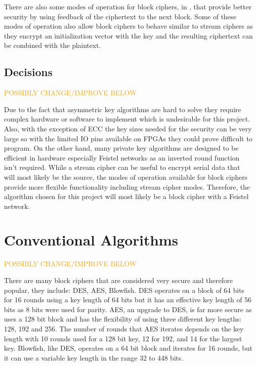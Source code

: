\documentclass[12pt,twoside,a4paper]{report}
\begin{document}
	There are also some modes of operation for block ciphers, in \cite{Dworkin2001}, that provide better security by using feedback of the ciphertext to the next block. Some of these modes of operation also allow block ciphers to behave similar to stream ciphers as they encrypt an initialization vector with the key and the resulting ciphertext can be combined with the plaintext.
    
    \subsection{Decisions}
    \label{section:cryp_decisions}
    
    \textcolor{orange}{POSSIBLY CHANGE/IMPROVE BELOW}
    
	Due to the fact that asymmetric key algorithms are hard to solve they require complex hardware or software to implement which is undesirable for this project. Also, with the exception of ECC the key sizes needed for the security can be very large so with the limited IO pins available on FPGAs they could prove difficult to program. On the other hand, many private key algorithms are designed to be efficient in hardware especially Feistel networks as an inverted round function isn't required. While a stream cipher can be useful to encrypt serial data that will most likely be the source, the modes of operation available for block ciphers provide more flexible functionality including stream cipher modes. Therefore, the algorithm chosen for this project will most likely be a block cipher with a Feistel network.
    
	\section{Conventional Algorithms}

	\textcolor{orange}{POSSIBLY CHANGE/IMPROVE BELOW}
    
	There are many block ciphers that are considered very secure and therefore popular, they include: DES\cite{ComputerSecurityDivision1999}, AES\cite{ComputerSecurityDivision2001}, Blowfish\cite{BruceSchneier1994}. DES operates on a block of 64 bits for 16 rounds using a key length of 64 bits but it has an effective key length of 56 bits as 8 bits were used for parity. AES, an upgrade to DES, is far more secure as uses a 128 bit block and has the flexibility of using three different key lengths: 128, 192 and 256. The number of rounds that AES iterates depends on the key length with 10 rounds used for a 128 bit key, 12 for 192, and 14 for the largest key. Blowfish, like DES, operates on a 64 bit block and iterates for 16 rounds, but it can use a variable key length in the range 32 to 448 bits.
    
\end{document}
